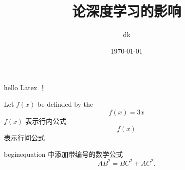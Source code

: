 \documentclass[UTF8]{ctexart}
\title{\heiti 论深度学习的影响}
\author{\kaishu dk}
\date{\today}
\begin{document}
	\maketitle	
	hello  Latex ！
	
	Let $f(x)$ be definded by the 
	$$f(x)=3x$$ 
	$f(x)$ 表示行内公式
	$$f(x)$$  表示行间公式
	
	begin{equation} 中添加带编号的数学公式
	\begin{equation}
	AB^2 = BC^2 + AC^2.
	\end{equation}
\end{document}
